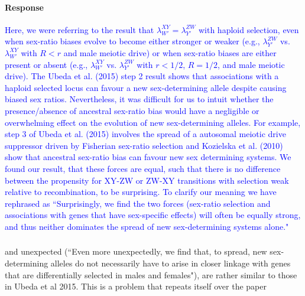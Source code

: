 \documentclass[10pt,letterpaper]{article}
\begin{document}
\noindent\paragraph{Response}
\textcolor{blue}{Here, we were referring to the result that $\lambda_{W'}^{XY} = \lambda_{Y'}^{ZW}$ with haploid selection, even when sex-ratio biases evolve to become either stronger or weaker (e.g., $\lambda_{Y'}^{ZW}$ vs. $\lambda_{W'}^{XY}$ with $R<r$ and male meiotic drive) or when sex-ratio biases are either present or absent (e.g., $\lambda_{W'}^{XY}$ vs. $\lambda_{Y'}^{ZW}$ with $r<1/2$, $R=1/2$, and male meiotic drive). The Ubeda et al. (2015) step 2 result shows that associations with a haploid selected locus can favour a new sex-determining allele despite causing biased sex ratios. Nevertheless, it was difficult for us to intuit whether the presence/absence of ancestral sex-ratio bias would have a negligible or overwhelming effect on the evolution of new sex-determining alleles. For example, step 3 of Ubeda et al. (2015) involves the spread of a autosomal meiotic drive suppressor driven by Fisherian sex-ratio selection and Kozielska et al. (2010) show that ancestral sex-ratio bias can favour new sex determining systems. We found our result, that these forces are equal, such that there is no difference between the propensity for XY-ZW or ZW-XY transitions with selection weak relative to recombination, to be surprising.} \textcolor{blue}{To clarify our meaning we have rephrased as ``Surprisingly, we find the two forces (sex-ratio selection and associations with genes that have sex-specific effects) will often be equally strong, and thus neither dominates the spread of new sex-determining systems alone."}

\noindent\subsubsection{}
\noindent and unexpected (``Even more unexpectedly, we find that, to spread, new sex-determining alleles do not necessarily have to arise in closer linkage with genes that are differentially selected in males and females"), are rather similar to those in Ubeda et al 2015. This is a problem that repeats itself over the paper 
\end{document}
